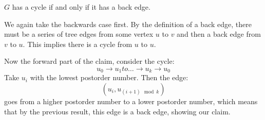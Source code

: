 \begin{theorem}
    $G$ has a cycle if and only if it has a back edge.

    We again take the backwards case first. By the definition of a back edge, there must be a series of tree edges from some vertex $u$ to $v$ and then a
    back edge from $v$ to $u$. This implies there is a cycle from $u$ to $u$.

    \begin{proof*}
    Now the forward part of the claim, consider the cycle:
    \[ u_0 \to u_1 to \dots \to u_k \to u_0 \]
    Take $u_i$ with the lowest postorder number. Then the edge:
    \[ (u_i, u_{(i + 1) \mod k}) \]
    goes from a higher postorder number to a lower postorder number, which means that by the previous result, this edge is a back edge, showing our claim.
    \end{proof*}
\end{theorem}
